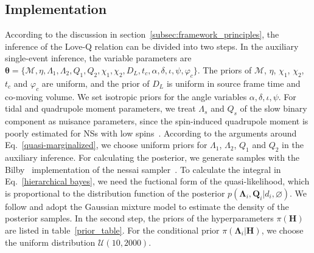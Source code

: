 \documentclass[a4paper,11pt]{article}
\begin{document}
\subsection{Implementation}
\label{subsec:simulation_implementation}

According to the discussion in section~\ref{subsec:framework_principles}, the inference of the Love-Q relation
can be divided into two steps.
In the auxiliary single-event inference, the variable parameters are $\bm{\theta} = \{\mathcal{M},\eta,
\Lambda_1,\Lambda_2,Q_1,Q_2,\chi_1,\chi_2,D_L,t_{c},\alpha,\delta,\iota,\psi,\varphi_{c}\}
$. The priors of $\mathcal{M}$, $\eta$, $\chi_1$, $\chi_2$, $t_{c}$ and $\varphi_{c}$ are uniform, and
the prior of $D_L$ is uniform in source frame time and co-moving volume. We 
set isotropic priors for the angle variables $\alpha,\delta,\iota,\psi$. For tidal 
and quadrupole moment parameters, we treat $\Lambda_s$ and $Q_s$ of the slow 
binary component as nuisance parameters, since the spin-induced 
quadrupole moment is poorly estimated for NSs with low spins~\cite{Yagi:2013awa}.
According to the arguments around Eq.~\eqref{quasi-marginalized}, we choose
uniform priors for $\Lambda_1$, $\Lambda_2$, $Q_1$ and $Q_2$ in the auxiliary inference.
For calculating the posterior, we generate samples with the {\sc
Bilby}~\cite{Ashton:2018jfp} implementation of the {\sc nessai}
sampler~\cite{Skilling:2004pqw,Skilling:2006gxv,michael_j_williams_2025_14627250,PhysRevD.103.103006,Williams:2023ppp}.
To calculate the integral in Eq.~\eqref{hierarchical bayes}, we need the
fuctional form of the quasi-likelihood, which is proportional to the
distribution function of the posterior
$p(\bm{\Lambda}_i,\bm{Q}_i|d_i,\varnothing)$. We follow
\citet{Golomb:2021tll} and adopt the Gaussian mixture 
model to estimate the density of the posterior samples.
In the second step, the priors of the hyperparameters $\pi(\bm{H})$ are listed
in table~\ref{prior_table}. For the conditional prior $\pi(\bm
{\Lambda}_i|\bm{H})$, we choose the uniform distribution $\mathcal{U}(10,2000)$. 
\end{document}

